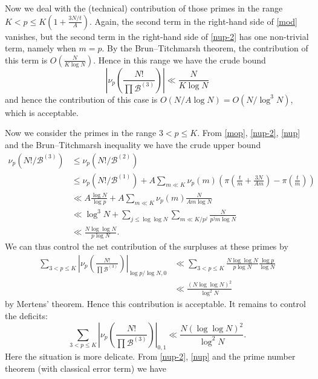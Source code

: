\documentclass[12pt,a4paper,reqno]{amsart}
\numberwithin{equation}{section}
\theoremstyle{plain}
\theoremstyle{definition}
\newcommand\tuple{{\mathcal B}}
\begin{document}
Now we deal with the (technical) contribution of those primes in the range $K < p \leq K(1+\frac{3N/t}{A})$.  Again, the second term in the right-hand side of \eqref{mod} vanishes, but the second term in the right-hand side of \eqref{nup-2} has one non-trivial term, namely when $m=p$.  By the Brun--Titchmarsh theorem, the contribution of this term is $O(\frac{N}{K \log N})$.  Hence in this range we have the crude bound
\begin{equation}\label{tech} 
\left|\nu_p\left(\frac{N!}{\prod \tuple^{(3)}}\right)\right|
\ll \frac{N}{K \log N}  \end{equation}
and hence the contribution of this case is $O(N/A \log N) = O(N/\log^3 N)$, which is acceptable.

Now we consider the primes in the range $3 < p \leq K$.  From \eqref{mop}, \eqref{nup-2}, \eqref{nup} and the Brun--Titchmarsh inequality we have the crude  upper bound
\begin{equation}\label{crude-upper}
\begin{split}
  \nu_p(N!/\tuple^{(3)}) &\leq
\nu_p(N!/\tuple^{(2)})  \\
&\leq \nu_p(N!/\tuple^{(1)}) + A \sum_{m \ll K} \nu_p(m) \left(\pi\left(\frac{t}{m}+\frac{3N}{Am}\right) - \pi\left(\frac{t}{m}\right)\right) \\
&\ll A \frac{\log N}{\log p} + A \sum_{m \ll K} \nu_p(m) \frac{N}{Am \log N} \\
&\ll \log^3 N + \sum_{j \leq \log\log N} \sum_{m \ll K/p^j} \frac{N}{p^j m \log N} \\
&\ll \frac{N \log\log N}{p \log N}.
\end{split}
\end{equation}
We can thus control the net contribution of the surpluses at these primes by
\begin{align*}
  \sum_{3 < p \leq K} \left|\nu_p\left(\frac{N!}{\prod \tuple^{(3)}}\right)\right|_{\log p/\log N,0} &\ll \sum_{3 < p \leq K}
  \frac{N \log\log N}{p \log N} \frac{\log p}{\log N} \\
  &\ll \frac{(N \log\log N)^2}{\log^2 N}
\end{align*}
by Mertens' theorem.  Hence this contribution is acceptable.  It remains to control the deficits:
\begin{equation}\label{deficit-targ}
\sum_{3 < p \leq K} \left|\nu_p\left(\frac{N!}{\prod \tuple^{(3)}}\right)\right|_{0, 1} \ll \frac{N (\log\log N)^2}{\log^2 N}.
\end{equation}
Here the situation is more delicate.  From \eqref{nup-2}, \eqref{nup} and the prime number theorem (with classical error term) we have
\end{document}
